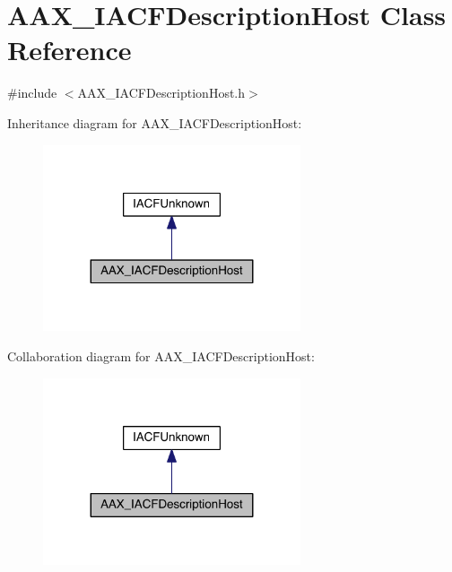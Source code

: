 \hypertarget{a00056}{}\section{A\+A\+X\+\_\+\+I\+A\+C\+F\+Description\+Host Class Reference}
\label{a00056}


{\ttfamily \#include $<$A\+A\+X\+\_\+\+I\+A\+C\+F\+Description\+Host.\+h$>$}



Inheritance diagram for A\+A\+X\+\_\+\+I\+A\+C\+F\+Description\+Host\+:
\nopagebreak
\begin{figure}[H]
\begin{center}
\leavevmode
\includegraphics[width=215pt]{a00511}
\end{center}
\end{figure}


Collaboration diagram for A\+A\+X\+\_\+\+I\+A\+C\+F\+Description\+Host\+:
\nopagebreak
\begin{figure}[H]
\begin{center}
\leavevmode
\includegraphics[width=215pt]{a00512}
\end{center}
\end{figure}


